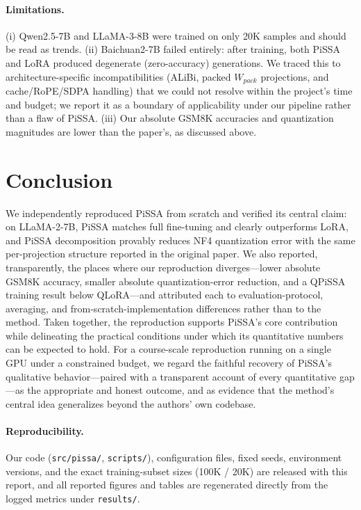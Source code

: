 \documentclass[mlmain]{jmlr}
\begin{document}
\paragraph{Limitations.} (i) Qwen2.5-7B and LLaMA-3-8B were trained on only 20K samples and should be read as trends. (ii) Baichuan2-7B failed entirely: after training, both PiSSA and LoRA produced degenerate (zero-accuracy) generations. We traced this to architecture-specific incompatibilities (ALiBi, packed $W_{pack}$ projections, and cache/RoPE/SDPA handling) that we could not resolve within the project's time and budget; we report it as a boundary of applicability under our pipeline rather than a flaw of PiSSA. (iii) Our absolute GSM8K accuracies and quantization magnitudes are lower than the paper's, as discussed above.

\section{Conclusion}
\label{sec:conclusion}
We independently reproduced PiSSA from scratch and verified its central claim: on LLaMA-2-7B, PiSSA matches full fine-tuning and clearly outperforms LoRA, and PiSSA decomposition provably reduces NF4 quantization error with the same per-projection structure reported in the original paper. We also reported, transparently, the places where our reproduction diverges---lower absolute GSM8K accuracy, smaller absolute quantization-error reduction, and a QPiSSA training result below QLoRA---and attributed each to evaluation-protocol, averaging, and from-scratch-implementation differences rather than to the method. Taken together, the reproduction supports PiSSA's core contribution while delineating the practical conditions under which its quantitative numbers can be expected to hold. For a course-scale reproduction running on a single GPU under a constrained budget, we regard the faithful recovery of PiSSA's qualitative behavior---paired with a transparent account of every quantitative gap---as the appropriate and honest outcome, and as evidence that the method's central idea generalizes beyond the authors' own codebase.

\paragraph{Reproducibility.} Our code (\texttt{src/pissa/}, \texttt{scripts/}), configuration files, fixed seeds, environment versions, and the exact training-subset sizes (100K / 20K) are released with this report, and all reported figures and tables are regenerated directly from the logged metrics under \texttt{results/}.
\end{document}
